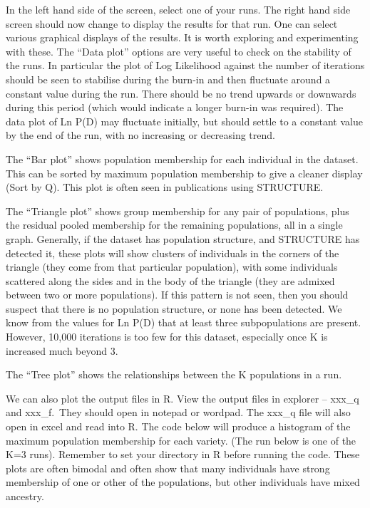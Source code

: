 \documentclass[
]{book}
\begin{document}
In the left hand side of the screen, select one of your runs. The right hand side screen should now change to display the results for that run. One can select various graphical displays of the results. It is worth exploring and experimenting with these. The ``Data plot'' options are very useful to check on the stability of the runs. In particular the plot of Log Likelihood against the number of iterations should be seen to stabilise during the burn-in and then fluctuate around a constant value during the run. There should be no trend upwards or downwards during this period (which would indicate a longer burn-in was required). The data plot of Ln P(D) may fluctuate initially, but should settle to a constant value by the end of the run, with no increasing or decreasing trend.

The ``Bar plot'' shows population membership for each individual in the dataset. This can be sorted by maximum population membership to give a cleaner display (Sort by Q). This plot is often seen in publications using STRUCTURE.

The ``Triangle plot'' shows group membership for any pair of populations, plus the residual pooled membership for the remaining populations, all in a single graph. Generally, if the dataset has population structure, and STRUCTURE has detected it, these plots will show clusters of individuals in the corners of the triangle (they come from that particular population), with some individuals scattered along the sides and in the body of the triangle (they are admixed between two or more populations). If this pattern is not seen, then you should suspect that there is no population structure, or none has been detected. We know from the values for Ln P(D) that at least three subpopulations are present. However, 10,000 iterations is too few for this dataset, especially once K is increased much beyond 3.

The ``Tree plot'' shows the relationships between the K populations in a run.

We can also plot the output files in R. View the output files in explorer -- xxx\_q and xxx\_f.~They should open in notepad or wordpad. The xxx\_q file will also open in excel and read into R. The code below will produce a histogram of the maximum population membership for each variety. (The run below is one of the K=3 runs). Remember to set your directory in R before running the code. These plots are often bimodal and often show that many individuals have strong membership of one or other of the populations, but other individuals have mixed ancestry.
\end{document}
